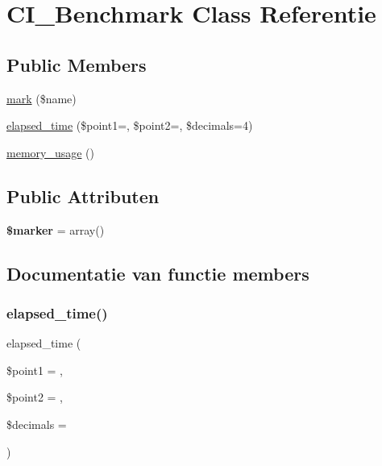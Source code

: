 \hypertarget{class_c_i___benchmark}{}\section{C\+I\+\_\+\+Benchmark Class Referentie}
\label{class_c_i___benchmark}
\subsection*{Public Members}
\begin{DoxyCompactItemize}
\item 
\mbox{\hyperlink{class_c_i___benchmark_a18c82f5dd0118d3e7c57bcd86dc32e9e}{mark}} (\$name)
\item 
\mbox{\hyperlink{class_c_i___benchmark_acfe5ce040b92f677e01b5dcc9cdcc3bf}{elapsed\+\_\+time}} (\$point1=\textquotesingle{}\textquotesingle{}, \$point2=\textquotesingle{}\textquotesingle{}, \$decimals=4)
\item 
\mbox{\hyperlink{class_c_i___benchmark_abdb10dca75c4c15f94796af1602d5b80}{memory\+\_\+usage}} ()
\end{DoxyCompactItemize}
\subsection*{Public Attributen}
\begin{DoxyCompactItemize}
\item 
\mbox{\label{class_c_i___benchmark_aad34fbf53cda6bd8a3a9c46764d534fa}} 
{\bfseries \$marker} = array()
\end{DoxyCompactItemize}


\subsection{Documentatie van functie members}
\mbox{\label{class_c_i___benchmark_acfe5ce040b92f677e01b5dcc9cdcc3bf}} 
\subsubsection{\texorpdfstring{elapsed\_time()}{elapsed\_time()}}
{\footnotesize\ttfamily elapsed\+\_\+time (\begin{DoxyParamCaption}\item[{}]{\$point1 = {\ttfamily \textquotesingle{}\textquotesingle{}},  }\item[{}]{\$point2 = {\ttfamily \textquotesingle{}\textquotesingle{}},  }\item[{}]{\$decimals = {} }\end{DoxyParamCaption})}

